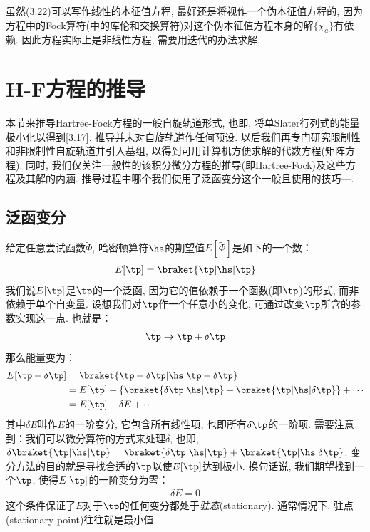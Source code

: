 虽然(3.22)可以写作线性的本征值方程, 
最好还是将视作一个伪本征值方程的, 
因为方程中的Fock算符(中的库伦和交换算符)对这个伪本征值方程本身的解$\{\chi_a \}$有依赖. 
因此\hft 方程实际上是非线性方程, 
需要用迭代的办法求解.

\section{H-F方程的推导}
本节来推导Hartree-Fock方程的一般自旋轨道形式, 
也即, 
将单Slater行列式的能量极小化以得到\autoref{3.17}. 
推导并未对自旋轨道作任何预设. 
以后我们再专门研究限制性和非限制性自旋轨道并引入基组, 
以得到可用计算机方便求解的代数方程(矩阵方程). 
同时, 
我们仅关注一般性的该积分微分方程的推导(即Hartree-Fock)及这些方程及其解的内涵. 
推导过程中哪个我们使用了泛函变分这个一般且使用的技巧—. 

\subsection{泛函变分}
\label{sec3.2.1}
给定任意尝试函数$\tilde{\Phi}$, 
哈密顿算符$\hs$的期望值$E[\tilde{\Phi}]$是如下的一个数：
\begin{align}
	E[\tp] = \braket{\tp|\hs|\tp}
\end{align}
我们说$E[\tp]$是$\tp$的一个泛函, 
因为它的值依赖于一个函数(即$\tp$)的形式, 
而非依赖于单个自变量. 
设想我们对$\tp$作一个任意小的变化, 
可通过改变$\tp$所含的参数实现这一点. 
也就是：
\begin{align}
	\tp \to \tp + \delta\tp
\end{align} 
那么能量变为：
\begin{align}
	E[\tp+\delta\tp] & = \braket{\tp+\delta\tp|\hs|\tp+\delta\tp} \notag\\
	& = E[\tp] + \{ \braket{\delta\tp|\hs|\tp} + \braket{\tp|\hs|\delta\tp} \} + \cdots \notag\\
	& = E[\tp] + \delta E + \cdots
\end{align}
其中$\delta E$叫作$E$的一阶变分, 
它包含所有线性项, 
也即所有$\delta\tp$的一阶项. 
需要注意到：我们可以微分算符的方式来处理$\delta$, 
也即, 
$\delta\braket{\tp|\hs|\tp} = \braket{\delta\tp|\hs|\tp} + \braket{\tp|\hs|\delta\tp}$. 
变分方法的目的就是寻找合适的$\tp$以使$E[\tp]$达到极小. 
换句话说, 
我们期望找到一个$\tp$, 
使得$E[\tp]$的一阶变分为零：
\begin{align}
	\delta E = 0
\end{align}
这个条件保证了$E$对于$\tp$的任何变分都处于\emph{驻态}(stationary). 
通常情况下, 
驻点(stationary point)往往就是最小值.


